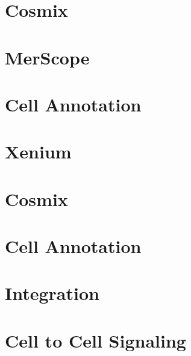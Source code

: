 \documentclass[
]{book}
\begin{document}
\chapter{Cosmix}\label{cosmix-4}

\chapter{MerScope}\label{merscope-4}

\chapter{Cell Annotation}\label{cell-annotation}

\chapter{Xenium}\label{xenium-5}

\chapter{Cosmix}\label{cosmix-5}

\chapter{Cell Annotation}\label{cell-annotation-1}

\chapter{Integration}\label{integration}

\chapter{Cell to Cell Signaling}\label{cell-to-cell-signaling}

  
\end{document}
